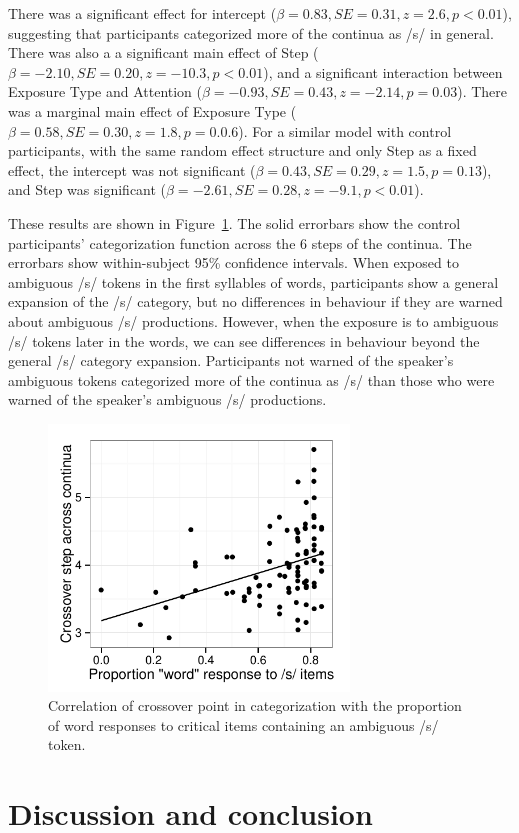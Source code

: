 \documentclass[a4paper,11pt,twocolumn]{article}
\begin{document}
There was a significant effect for intercept ($\beta = 0.83, SE = 0.31, z = 2.6, p < 0.01$), suggesting that participants categorized more of the continua as /s/ in general.  There was also a a significant main effect of Step ($\beta = -2.10, SE = 0.20, z = -10.3, p < 0.01$), and a significant interaction between Exposure Type and Attention ($\beta = -0.93, SE = 0.43, z = -2.14, p = 0.03$).  There was a marginal main effect of Exposure Type ($\beta =0.58 , SE = 0.30, z = 1.8, p = 0.0.6$).  For a similar model with control participants, with the same random effect structure and only Step as a fixed effect, the intercept was not significant ($\beta = 0.43, SE = 0.29, z = 1.5, p = 0.13$), and Step was significant ($\beta = -2.61, SE = 0.28, z = -9.1, p < 0.01$).

These results are shown in Figure~\ref{fig:categ}.  The solid errorbars show the control participants' categorization function across the 6 steps of the continua.  The errorbars show within-subject 95\% confidence intervals.  When exposed to ambiguous /s/ tokens in the first syllables of words, participants show a general expansion of the /s/ category, but no differences in behaviour if they are warned about ambiguous /s/ productions.  However, when the exposure is to ambiguous /s/ tokens later in the words, we can see differences in behaviour beyond the general /s/ category expansion.  Participants not warned of the speaker's ambiguous tokens categorized more of the continua as /s/ than those who were warned of the speaker's ambiguous /s/ productions.

\begin{figure}[!ht]
\caption{Correlation of crossover point in categorization with the proportion of word responses to critical items containing an ambiguous /s/ token.}\label{fig:categ}
\begin{center}
\includegraphics[width=80mm]{xoverwordresp}
\end{center}
\end{figure}

\section{Discussion and conclusion}





\end{document}
